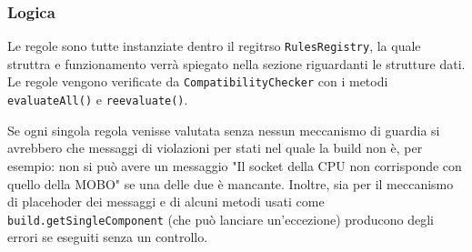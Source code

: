 \documentclass[12pt,a4paper]{article}
\begin{document}
\subsubsection{Logica}
Le regole sono tutte instanziate dentro il regitrso \texttt{RulesRegistry}, la quale struttra e funzionamento verrà spiegato nella sezione riguardanti le strutture dati. \\
Le regole vengono verificate da \texttt{CompatibilityChecker} con i metodi \texttt{evaluateAll()} e \texttt{reevaluate()}.

Se ogni singola regola venisse valutata senza nessun meccanismo di guardia si avrebbero che messaggi di violazioni per stati nel quale la build non è, per esempio: non si può avere un messaggio "Il socket della CPU non corrisponde con quello della MOBO" se una delle due è mancante. Inoltre, sia per il meccanismo di placehoder dei messaggi e di alcuni metodi usati come \texttt{build.getSingleComponent} (che può lanciare un'eccezione) producono degli errori se eseguiti senza un controllo.
\end{document}
